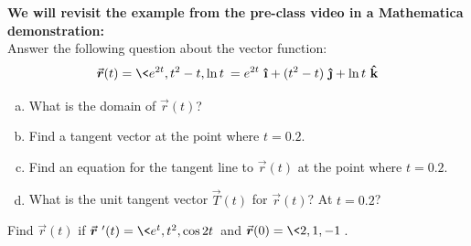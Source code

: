 \begin{list}{\bf{Example : }}{}

\item \textbf{We will revisit the example from the pre-class video in a Mathematica demonstration:}
\\Answer the following question about the vector function:
\[
\vec{r}(t) = \< e^{2t},t^2-t,\ln t\> = e^{2t}\ \ihat + (t^2-t)\ \jhat + \ln t\ \khat
\]

\begin{enumerate}[a)]

\item What is the domain of \(\vec{r}(t)\)?

\vfill

\item Find a tangent vector at the point where \(t=0.2\).

\vfill

\item Find an equation for the tangent line to \(\vec{r}(t)\) at the point where \(t=0.2\).

\vfill

\item What is the unit tangent vector \(\vec{T}(t)\) for \(\vec{r}(t)\)?  At \(t=0.2\)?

\vfill

\end{enumerate}

\item Find \(\vec{r}(t)\) if \(\vec{r}\ '(t) = \< e^t, t^2, \cos 2t\>\) and \(\vec{r}(0) = \<2,1,-1\>\).
\\
\vfill

\end{list}

